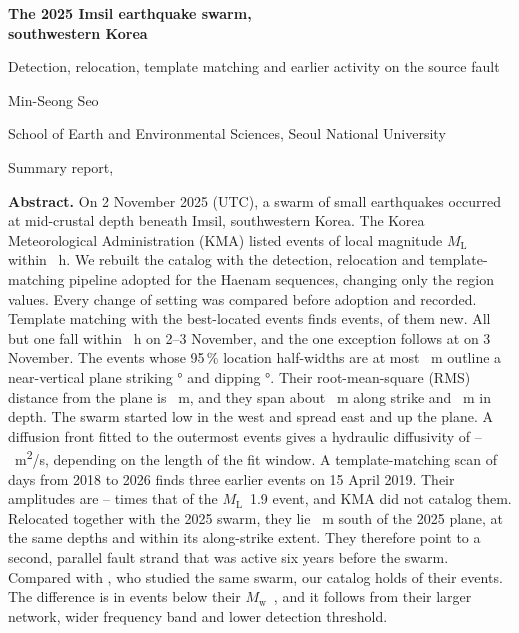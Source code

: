 \documentclass[11pt,a4paper]{article}
\newcommand{\Mw}{\ensuremath{M_\mathrm{w}}}
\newcommand{\ML}{\ensuremath{M_\mathrm{L}}}
\newcommand{\msq}{m\textsuperscript{2}/s}
\begin{document}
\begin{center}
{\sffamily\bfseries\LARGE\color{headblue} The 2025 Imsil earthquake swarm,\\[2pt] southwestern Korea\par}
\vspace{4pt}
{\sffamily\large Detection, relocation, template matching and earlier activity on the source fault\par}
\vspace{8pt}
{\normalsize Min-Seong Seo\par}
{\small School of Earth and Environmental Sciences, Seoul National University\par}
\vspace{2pt}
{\small Summary report, \par}
\end{center}

\vspace{2pt}
\noindent\begin{minipage}{\textwidth}
\small
\textbf{\sffamily Abstract.}
On 2 November 2025 (UTC), a swarm of small earthquakes occurred at mid-crustal depth beneath Imsil, southwestern Korea. The Korea Meteorological Administration (KMA) listed  events of local magnitude \ML\  within ~h.
We rebuilt the catalog with the detection, relocation and template-matching pipeline adopted for the Haenam sequences, changing only the region values. Every change of setting was compared before adoption and recorded.
Template matching with the  best-located events finds  events,  of them new. All but one fall within ~h on 2--3 November, and the one exception follows at  on 3 November.
The  events whose 95\,\% location half-widths are at most ~m outline a near-vertical plane striking ° and dipping °. Their root-mean-square (RMS) distance from the plane is ~m, and they span about ~m along strike and ~m in depth.
The swarm started low in the west and spread east and up the plane. A diffusion front fitted to the outermost events gives a hydraulic diffusivity of --~\msq, depending on the length of the fit window.
A template-matching scan of  days from 2018 to 2026 finds three earlier events on 15 April 2019. Their amplitudes are -- times that of the \ML\ 1.9 event, and KMA did not catalog them.
Relocated together with the 2025 swarm, they lie ~m south of the 2025 plane, at the same depths and within its along-strike extent. They therefore point to a second, parallel fault strand that was active six years before the swarm.
Compared with \citet{Park2026}, who studied the same swarm, our catalog holds  of their events. The difference is in events below their \Mw\ , and it follows from their larger network, wider frequency band and lower detection threshold.
\end{minipage}
\vspace{4pt}
\end{document}
